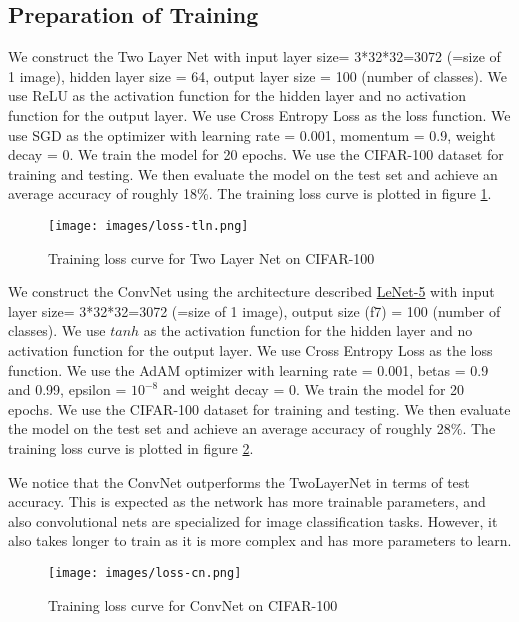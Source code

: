 \documentclass{article}
\begin{document}
\subsection{Preparation of Training}
We construct the Two Layer Net with input layer size= 3*32*32=3072 (=size of 1 image), hidden layer size = 64, output layer size = 100 (number of classes). We use ReLU as the activation function for the hidden layer and no activation function for the output layer. We use Cross Entropy Loss as the loss function. We use SGD as the optimizer with learning rate = 0.001, momentum = 0.9, weight decay = 0. We train the model for 20 epochs. We use the CIFAR-100 dataset for training and testing. We then evaluate the model on the test set and achieve an average accuracy of roughly 18\%. The training loss curve is plotted in figure \ref{fig:loss-tln}.

\begin{figure}[h]
    \centering
    \texttt{[image: images/loss-tln.png]}
    \caption{Training loss curve for Two Layer Net on CIFAR-100} 
    \label{fig:loss-tln}
\end{figure}

We construct the ConvNet using the architecture described \href{https://ieeexplore.ieee.org/document/726791}{LeNet-5} with input layer size= 3*32*32=3072 (=size of 1 image), output size (f7) = 100 (number of classes). We use $tanh$ as the activation function for the hidden layer and no activation function for the output layer. We use Cross Entropy Loss as the loss function. We use the AdAM optimizer with learning rate = 0.001, betas = 0.9 and 0.99, epsilon = $10^{-8}$ and weight decay = 0. We train the model for 20 epochs. We use the CIFAR-100 dataset for training and testing. We then evaluate the model on the test set and achieve an average accuracy of roughly 28\%. The training loss curve is plotted in figure \ref{fig:loss-cn}.

We notice that the ConvNet outperforms the TwoLayerNet in terms of test accuracy. This is expected as the network has more trainable parameters, and also convolutional nets are specialized for image classification tasks. However, it also takes longer to train as it is more complex and has more parameters to learn. 

\begin{figure}[h]
    \centering
    \texttt{[image: images/loss-cn.png]}
    \caption{Training loss curve for ConvNet on CIFAR-100} 
    \label{fig:loss-cn}
\end{figure}
\end{document}

